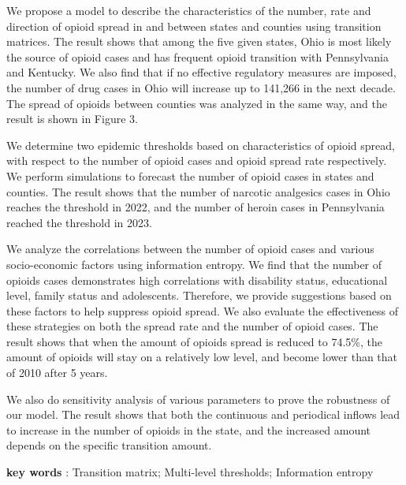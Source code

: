 \documentclass[13pt]{ctexart}
\begin{document}
\begin{adjustwidth}{1cm}{1cm}
\indent { }{ }{ }{ }{ }{ }We propose a model to describe the characteristics of the number, rate and direction of opioid spread in and between states and counties using transition matrices. The result shows that among the five given states, Ohio is most likely the source of opioid cases and has frequent opioid transition with Pennsylvania and Kentucky. We also find that if no effective regulatory measures are imposed, the number of drug cases in Ohio will increase up to 141,266 in the next decade. The spread of opioids between counties was analyzed in the same way, and the result is shown in Figure 3.

We determine two epidemic thresholds based on characteristics of opioid spread, with respect to the number of opioid cases and opioid spread rate respectively. We perform simulations to forecast the number of opioid cases in states and counties. The result shows that the number of narcotic analgesics cases in Ohio reaches the threshold in 2022, and the number of heroin cases in Pennsylvania reached the threshold in 2023.

We analyze the correlations between the number of opioid cases and various socio-economic factors using information entropy. We find that the number of opioids cases demonstrates high correlations with disability status, educational level, family status and adolescents. Therefore, we provide suggestions based on these factors to help suppress opioid spread. We also evaluate the effectiveness of these strategies on both the spread rate and the number of opioid cases. The result shows that when the amount of opioids spread is reduced to 74.5\%, the amount of opioids will stay on a relatively low level, and become lower than that of 2010 after 5 years.

We also do sensitivity analysis of various parameters to prove the robustness of our model. The result shows that both the continuous and periodical inflows lead to increase in the number of opioids in the state, and the increased amount depends on the specific transition amount.

\vspace{15pt}
\textbf{key words} : Transition matrix; Multi-level thresholds; Information entropy
\end{adjustwidth} 

\setmainfont{texgyrepagella-regular.otf} 
\newpage
{}
\thispagestyle{empty}
\end{document}

